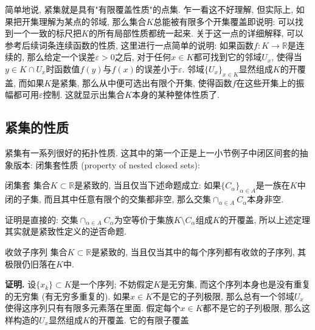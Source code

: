 简单地说, 紧集就是具有"有限覆盖性质"的点集. 乍一看这不好理解, 但实际上, 如果把开集理解为某点的邻域, 那么集合$K$总能被有限多个开集覆盖即说明: 可以找到一个一致的标尺把$K$的所有局部性质都统一起来. 关于这一点的详细解释, 可以参考后续词条连续函数的性质, 这里进行一点简单的说明: 如果函数$f:K\to\mathbb{R}$是连续的, 那么给定一个误差$\varepsilon>0$之后, 对于任何$x\in K$都可找到它的邻域$U_{x}$, 使得当$y\in K\cap U_x$时函数值$f(y)$与$f(x)$的误差小于$\varepsilon$. 邻域$\{U_x\}_{x\in K}$显然组成$K$的开覆盖, 而如果$K$是紧集, 那么从中便可选出有限个开集, 使得函数$f$在这些开集上的振幅都可用$\varepsilon$控制. 这就显示出集合$K$本身的某种整体性质了.

\subsection{紧集的性质}
紧集有一系列很好的拓扑性质. 这其中的第一个正是上一小节例子中闭区间套的抽象版本: 闭集套性质 (property of nested closed sets):

\begin{theorem}{闭集套}
集合$K\subset\mathbb{R}$是紧致的, 当且仅当下述命题成立: 如果$\{C_\alpha\}_{\alpha\in A}$是一族在$K$中闭的子集, 而且其中任意有限个的交集都非空, 那么交集$\cap_{\alpha\in A}C_\alpha$本身非空. 
\end{theorem}

证明是直接的: 交集$\cap_{\alpha\in A}C_\alpha$为空等价于集族$K\setminus C_\alpha$组成$K$的开覆盖, 所以上述定理其实就是紧致性定义的逆否命题.

\begin{theorem}{收敛子序列}
集合$K\subset\mathbb{R}$是紧致的, 当且仅当其中的每个序列都有收敛的子序列, 其极限仍旧落在$K$中.
\end{theorem}

\textbf{证明.} 设$\{x_k\}\subset K$是一个序列; 不妨假定$K$是无穷集, 而这个序列本身也是没有重复的无穷集 (有无穷多重复的). 如果$x\in K$不是它的子列极限, 那么总有一个邻域$U_x$使得这序列只有有限多元素落在里面. 假定每个$x\in K$都不是它的子列极限, 那么这样构造的$U_x$显然组成$K$的开覆盖. 它的有限子覆盖